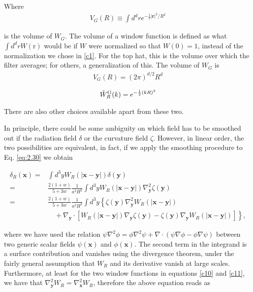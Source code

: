 \begin{appendices}
Where
\begin{align}
    V_G(R) \equiv \int d^d r e^{-\frac{1}{2}|\mathbf{r}|^2 / R^2}
\end{align}

is the volume of $W_G$. The volume of a window function is defined as what $\int d^d r W(\mathrm{r})$ would be if $W$ were normalized so that $W(0)=1$, instead of the normalization we chose in \ref{c1}. For the top hat, this is the volume over which the filter averages; for others, a generalization of this.
The volume of $W_G$ is 
\begin{align}
    V_G(R)=(2 \pi)^{d / 2} R^d
\end{align}

\begin{align}
    \Tilde{W}_{R}^{\text {G}}(k)=e^{-\frac{1}{2}(k R)^2}
\end{align}


There are also other choices available apart from these two.

In principle, there could be some ambiguity on which field has to be smoothed out if the radiation field $\delta$ or the curvature field $\zeta$. However, in linear order, the two possibilities are equivalent, in fact, if we apply the smoothing procedure to Eq. \eqref{eq:2.30} we obtain

\begin{align}
    \delta_{R}(\mathbf{x})= & \int d^{3} y W_{R}(|\mathbf{x}-\mathbf{y}|) \delta(\mathbf{y}) \\
    = & \frac{2(1+w)}{5+3 w} \frac{1}{a^{2} H^{2}} \int d^{3} y W_{R}(|\mathbf{x}-\mathbf{y}|) \nabla_{\mathbf{y}}^{2} \zeta(\mathbf{y}) \\
    = & \frac{2(1+w)}{5+3 w} \frac{1}{a^{2} H^{2}} \int d^{3} y\left\{\zeta(\mathbf{y}) \nabla_{\mathbf{y}}^{2} W_{R}(|\mathbf{x}-\mathbf{y}|)\right. \\
    & \left.\quad+\nabla_{\mathbf{y}} \cdot\left[W_{R}(|\mathbf{x}-\mathbf{y}|) \nabla_{\mathbf{y}} \zeta(\mathbf{y})-\zeta(\mathbf{y}) \nabla_{\mathbf{y}} W_{R}(|\mathbf{x}-\mathbf{y}|)\right]\right\},
\end{align}

where we have used the relation $\psi \nabla^{2} \phi=\phi \nabla^{2} \psi+\nabla \cdot(\psi \nabla \phi-\phi \nabla \psi)$ between two generic scalar fields $\psi(\mathbf{x})$ and $\phi(\mathbf{x})$. The second term in the integrand is a surface contribution and vanishes using the divergence theorem, under the fairly general assumption that $W_{R}$ and its derivative vanish at large scales. Furthermore, at least for the two window functions in equations  \ref{c10} and \ref{c11}, we have that $\nabla_{\mathbf{y}}^{2} W_{R}=\nabla_{\mathbf{x}}^{2} W_{R}$, therefore the above equation reads as


\end{appendices}
